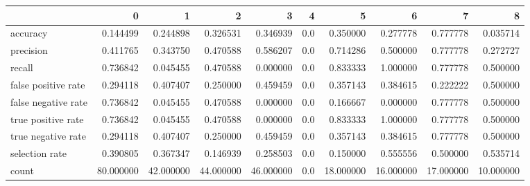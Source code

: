 \begin{tabular}{lrrrrrrrrr}
\toprule
{} &          0 &          1 &          2 &          3 &    4 &          5 &          6 &          7 &          8 \\
\midrule
accuracy            &   0.144499 &   0.244898 &   0.326531 &   0.346939 &  0.0 &   0.350000 &   0.277778 &   0.777778 &   0.035714 \\
precision           &   0.411765 &   0.343750 &   0.470588 &   0.586207 &  0.0 &   0.714286 &   0.500000 &   0.777778 &   0.272727 \\
recall              &   0.736842 &   0.045455 &   0.470588 &   0.000000 &  0.0 &   0.833333 &   1.000000 &   0.777778 &   0.500000 \\
false positive rate &   0.294118 &   0.407407 &   0.250000 &   0.459459 &  0.0 &   0.357143 &   0.384615 &   0.222222 &   0.500000 \\
false negative rate &   0.736842 &   0.045455 &   0.470588 &   0.000000 &  0.0 &   0.166667 &   0.000000 &   0.777778 &   0.500000 \\
true positive rate  &   0.736842 &   0.045455 &   0.470588 &   0.000000 &  0.0 &   0.833333 &   1.000000 &   0.777778 &   0.500000 \\
true negative rate  &   0.294118 &   0.407407 &   0.250000 &   0.459459 &  0.0 &   0.357143 &   0.384615 &   0.777778 &   0.500000 \\
selection rate      &   0.390805 &   0.367347 &   0.146939 &   0.258503 &  0.0 &   0.150000 &   0.555556 &   0.500000 &   0.535714 \\
count               &  80.000000 &  42.000000 &  44.000000 &  46.000000 &  0.0 &  18.000000 &  16.000000 &  17.000000 &  10.000000 \\
\bottomrule
\end{tabular}
